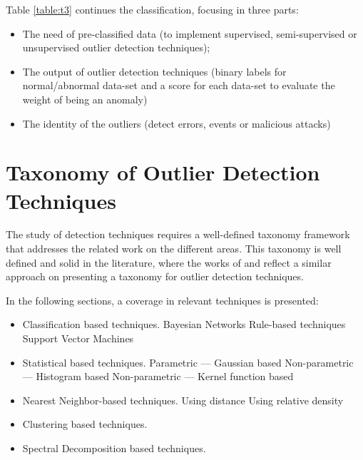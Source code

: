 Table \ref{table:t3} continues the classification, focusing in three parts: 
\begin{itemize}
		\setlength\itemsep{-0.5em}
		\item The need of pre-classified data (to implement supervised, semi-supervised or unsupervised outlier detection techniques);
		
		\item The output of outlier detection techniques (binary labels for normal/abnormal data-set and a score for each data-set to evaluate the weight of being an anomaly)
		
		\item The identity of the outliers (detect errors, events or malicious attacks)
\end{itemize}

\newpage



\vspace{2em}



\section{Taxonomy of Outlier Detection Techniques}
\label{sec:taxon}
The study of detection techniques requires a well-defined taxonomy framework that addresses the related work on the different areas. This taxonomy is well defined and solid in the literature, where the works of \cite{gen:zhang:2010} and \cite{gen:chandola:2009} reflect a similar approach on presenting a taxonomy for outlier detection techniques.

In the following sections, a coverage in relevant techniques is presented:

\begin{itemize}
	\setlength\itemsep{-0.5em}
	\item Classification based techniques.
	\subitem Bayesian Networks
	\subitem Rule-based techniques
	\subitem Support Vector Machines
	
	\item Statistical based techniques.
	\subitem Parametric --- Gaussian based
	\subitem Non-parametric --- Histogram based
	\subitem Non-parametric --- Kernel function based
	
	\item Nearest Neighbor-based techniques.
	\subitem Using distance
	\subitem Using relative density
	
	\item Clustering based techniques.
	
	\item Spectral Decomposition based techniques.
	
\end{itemize}












